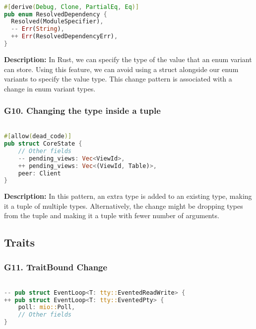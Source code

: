 \begin{lstlisting}[language=Rust, style=colouredRust, label={l3}]

#[derive(Debug, Clone, PartialEq, Eq)]
pub enum ResolvedDependency {
  Resolved(ModuleSpecifier),
  -- Err(String),
  ++ Err(ResolvedDependencyErr),
}

\end{lstlisting}

\noindent \textbf{Description:} In Rust, we can specify the type of the value that an enum variant can store. Using this feature, we can avoid using a struct alongside our enum variants to specify the value type. This change pattern is associated with a change in enum variant types.

\subsubsection{G10. Changing the type inside a tuple}

\begin{lstlisting}[language=Rust, style=colouredRust, label={l3}]

#[allow(dead_code)]
pub struct CoreState {
    // Other fields
    -- pending_views: Vec<ViewId>,
    ++ pending_views: Vec<(ViewId, Table)>,
    peer: Client
}

\end{lstlisting}

\noindent \textbf{Description:} In this pattern, an extra type is added to an existing type, making it a tuple of multiple types. Alternatively, the change might be dropping types from the tuple and making it a tuple with fewer number of arguments.

\subsection{Traits}
\subsubsection{G11. TraitBound Change}

\begin{lstlisting}[language=Rust, style=colouredRust, label={l3}]

-- pub struct EventLoop<T: tty::EventedReadWrite> {
++ pub struct EventLoop<T: tty::EventedPty> {
    poll: mio::Poll,
    // Other fields
}

\end{lstlisting}

